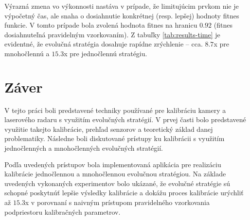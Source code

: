 \documentclass[12pt, a4paper]{article}
\begin{document}
Výrazná zmena vo výkonnosti nastáva v prípade, že limitujúcim prvkom nie je výpočetný čas, ale snaha o dosiahnutie konkrétnej (resp. lepšej) hodnoty fitnes funkcie. V tomto prípade bola zvolená hodnota fitnes na hranicu $0.92$ (fitnes dosiahnuteľná pravidelným vzorkovaním). Z tabuľky \ref{tab:results-time} je evidentné, že evolučná stratégia dosahuje rapídne zrýchlenie -- cca. $8.7$x pre mnohočlennú a $15.3$x pre jednočlennú stratégiu.   

\section{Záver}
V tejto práci boli predstavené techniky používané pre kalibráciu kamery a laserového radaru s využitím evolučných stratégií. V prvej časti bolo predstavené využitie takejto kalibrácie, prehľad senzorov a teoretický základ danej problematiky. Následne boli diskutované prístupy ku kalibrácii s využitím jednočlenných a mnohočlenných evolučných stratégií.

Podľa uvedených prístupov bola implementovaná aplikácia pre realizáciu kalibrácie jednočlennou a mnohočlennou evolučnou stratégiou. Na základe uvedených vykonaných experimentov bolo ukázané, že evolučné stratégie sú schopné poskytnúť lepšie výsledky kalibrácie a dokážu proces kalibrácie urýchliť až $15.3$x v porovnaní s naivným prístupom pravidelného vzorkovania podpriestoru kalibračných parametrov.


\begin{flushleft}
  
\end{flushleft}
\end{document}
